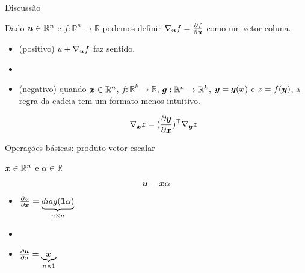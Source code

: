 \documentclass[10pt]{beamer}
\begin{document}
\begin{frame}{Discussão}
\large{
Dado $\bm{u} \in \mathbb{R}^{n}$ e $f:\mathbb{R}^{n} \rightarrow \mathbb{R}$ podemos definir $\nabla_{\bm{u}} {f} = \frac{\partial f}{\partial \bm{u}}$ como um vetor coluna. 

\vspace{0.3cm}
\begin{itemize}
\item (\alert{positivo}) $u  + \nabla_{\bm{u}} {f}$ faz sentido.

\item[]


\item (\alert{negativo}) quando $\bm{x} \in \mathbb{R}^{n}$, $f:\mathbb{R}^{k} \rightarrow \mathbb{R}$, $\bm{g}:\mathbb{R}^{n} \rightarrow \mathbb{R}^{k}$, $\bm{y} = \bm{g}(\bm{x})$ e $z = f(\bm{y})$, a regra da cadeia tem um formato menos intuitivo.

\begin{equation*}
\nabla_{\bm{x}} {z} = (\frac{\partial \bm{y}}{\partial \bm{x}})^{\top} \nabla_{\bm{y}} {z}
\end{equation*}

\end{itemize}
}
\end{frame}



\begin{frame}{Operações básicas: produto vetor-escalar}
\Large{
$\bm{x}\in \mathbb{R}^{n}$ e $\alpha \in \mathbb{R}$

\vspace{0.3 cm}

\begin{equation*}
\bm{u} = \bm{x}\alpha
\end{equation*}

\vspace{0.3 cm}
\begin{itemize}
\item $\frac{\partial \bm{u}}{\partial \bm{x}} = \underbrace{diag(\bm{1}\alpha)}_{\tiny{n \times n}}$
\item[]
\item $\frac{\partial \bm{u}}{\partial \alpha} = \underbrace{\bm{x}}_{\tiny{n \times 1}}$
\end{itemize}
}
\end{frame}
\end{document}
